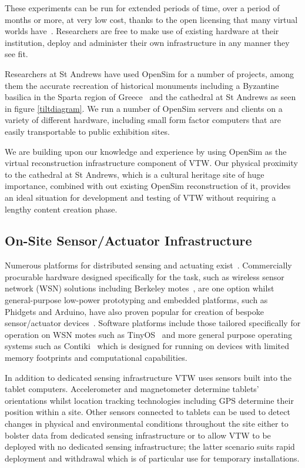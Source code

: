 \documentclass[conference,a4paper]{IEEEtran}
\begin{document}
These experiments can be run for extended periods of time, over a period of months or more, at very low cost, thanks to the open licensing that many virtual worlds have~\cite{Bainbridge2007}. Researchers are free to make use of existing hardware at their institution, deploy and administer their own infrastructure in any manner they see fit.

Researchers at St Andrews have used OpenSim for a number of projects, among them the accurate recreation of historical monuments including a Byzantine basilica in the Sparta region of Greece~\cite{Getchell2010} and the cathedral at St Andrews as seen in figure \ref{tiltdiagram}. We run a number of OpenSim servers and clients on a variety of different hardware, including small form factor computers that are easily transportable to public exhibition sites.

We are building upon our knowledge and experience by using OpenSim as the virtual reconstruction infrastructure component of VTW. Our physical proximity to the cathedral at St Andrews, which is a cultural heritage site of huge importance, combined with out existing OpenSim reconstruction of it, provides an ideal situation for development and testing of VTW without requiring a lengthy content creation phase.

\subsection{On-Site Sensor/Actuator Infrastructure}
\label{subsec:onsitesensoractuatorinfrastructure}
Numerous platforms for distributed sensing and actuating exist~\cite{Bose2009}. Commercially procurable hardware designed specifically for the task, such as wireless sensor network (WSN) solutions including Berkeley motes~\cite{Bose2009}, are one option whilst general-purpose low-power prototyping and embedded platforms, such as Phidgets and Arduino, have also proven popular for creation of bespoke sensor/actuator devices~\cite{Faludi2010}. Software platforms include those tailored specifically for operation on WSN motes such as TinyOS~\cite{TinyOSAlliance} and more general purpose operating systems such as Contiki~\cite{Dunkels} which is designed for running on devices with limited memory footprints and computational capabilities.

In addition to dedicated sensing infrastructure VTW uses sensors built into the tablet computers. Accelerometer and magnetometer determine tablets' orientations whilst location tracking technologies including GPS determine their position within a site. Other sensors connected to tablets can be used to detect changes in physical and environmental conditions throughout the site either to bolster data from dedicated sensing infrastructure or to allow VTW to be deployed with no dedicated sensing infrastructure; the latter scenario suits rapid deployment and withdrawal which is of particular use for temporary installations.
\end{document}
